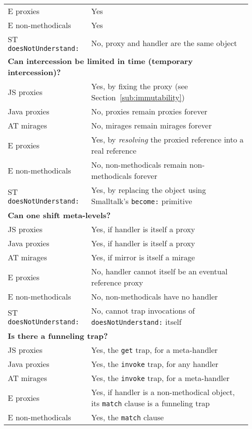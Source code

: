 \documentclass{acm_proc_article-sp}
\begin{document}
\begin{table*}
\begin{tabular}{|p{}|p{}|}
    E proxies         & Yes\\
    E non-methodicals & Yes\\
    ST \texttt{doesNotUnderstand:}  & No, proxy and handler are the same object\\
    \hline
    \multicolumn{2}{|l|}{\textbf{Can intercession be limited in time (temporary intercession)?}}\\
    \hline
    JS proxies        & Yes, by fixing the proxy (see Section~\ref{sub:immutability})\\
    Java proxies      & No, proxies remain proxies forever\\
    AT mirages        & No, mirages remain mirages forever\\
    E proxies         & Yes, by \emph{resolving} the proxied reference into a real reference\\
    E non-methodicals & No, non-methodicals remain non-methodicals forever\\
    ST \texttt{doesNotUnderstand:}  & Yes, by replacing the object using Smalltalk's \texttt{become:} primitive\\
    \hline
    \multicolumn{2}{|l|}{\textbf{Can one shift meta-levels?}}\\
    \hline
    JS proxies        & Yes, if handler is itself a proxy\\
    Java proxies      & Yes, if handler is itself a proxy\\
    AT mirages        & Yes, if mirror is itself a mirage\\
    E proxies         & No, handler cannot itself be an eventual reference proxy\\
    E non-methodicals & No, non-methodicals have no handler\\
    ST \texttt{doesNotUnderstand:}  & No, cannot trap invocations of \texttt{doesNotUnderstand:} itself\\
    \hline
    \multicolumn{2}{|l|}{\textbf{Is there a funneling trap?}}\\
    \hline
    JS proxies        & Yes, the \texttt{get} trap, for a meta-handler\\
    Java proxies      & Yes, the \texttt{invoke} trap, for any handler\\
    AT mirages        & Yes, the \texttt{invoke} trap, for a meta-handler\\
    E proxies         & Yes, if handler is a non-methodical object, its \texttt{match} clause is a funneling trap\\
    E non-methodicals & Yes, the \texttt{match} clause\\

\end{tabular}
\end{table*}
\end{document}
